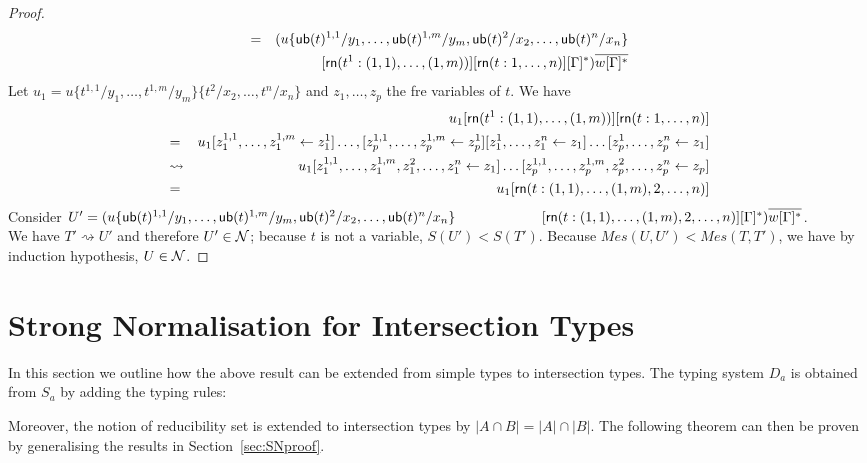 \documentclass[orivec]{llncs}
\newif\ifnonotes\nonotesfalse
\newcommand{\TODO}[1]{\ifnonotes\else{\color{red}    \noindent{\bf TODO }#1}\fi}
\begin{document}
\begin{proof}
\begin{eqnarray*}
    & = & (u\{{\mathsf{ub}}(t)^{1,1}/y_1,\dots,{\mathsf{ub}}(t)^{1,m}/y_m, {\mathsf{ub}}(t)^2/x_2,\dots,{\mathsf{ub}}(t)^n/x_n\} \\
    &   & [{\mathsf{rn}} (t^1:(1,1),\dots,(1,m))][{\mathsf{rn}} (t:1,\dots,n)][\Gamma]^*)\overline{w[\Gamma]^*}
\end{eqnarray*}
%
Let $u_1 = u\{t^{1,1}/y_1,\dots,t^{1,m}/y_m\}\{t^2/x_2,\dots,t^n/x_n\}$ and $z_1,\dots,z_p$ the fre variables of $t$. We have
%
\begin{eqnarray*}
  &                   & u_1[{\mathsf{rn}} (t^1:(1,1),\dots,(1,m))][{\mathsf{rn}} (t:1,\dots,n)] \\
  & =                 & u_1[z_1^{1,1}, \dots, z_1^{1,m} \leftarrow z_1^1]\dots, [z_p^{1,1}, \dots, z_p^{1,m} \leftarrow z_p^1][z_1^1,\dots,z_1^n\leftarrow z_1]\dots [z_p^1,\dots,z_p^n\leftarrow z_1] \\
  & \rightsquigarrow  & u_1[z_1^{1,1}, \dots, z_1^{1,m}, z_1^2,\dots,z_1^n\leftarrow z_1]\dots [z_p^{1,1}, \dots, z_p^{1,m}, z_p^2,\dots,z_p^n\leftarrow z_p] \\
  &  =                & u_1[{\mathsf{rn}} (t:(1,1),\dots,(1,m),2,\dots,n)]
\end{eqnarray*}
Consider $U' = (u\{{\mathsf{ub}}(t)^{1,1}/y_1,\dots,{\mathsf{ub}}(t)^{1,m}/y_m, {\mathsf{ub}}(t)^2/x_2,\dots,{\mathsf{ub}}(t)^n/x_n\} \\
\hspace*{62pt}[{\mathsf{rn}} (t:(1,1),\dots,(1,m),2,\dots,n)][\Gamma]^*)\overline{w[\Gamma]^*}$.
\\
We have $T'\rightsquigarrow U'$ and therefore $U'\in\mathcal{N}$; because $t$ is not a variable, $S(U')<S(T')$.
Because $Mes(U,U') < Mes(T,T')$, we have by induction hypothesis, $U\in\mathcal{N}$.


\end{proof}





\section{Strong Normalisation for Intersection Types}

In this section we outline how the above result can be extended from simple types to intersection types. The typing system $D_a$ is obtained from $S_a$ by adding the typing rules:

Moreover, the notion of reducibility set is extended to intersection types by $|A\cap B|=|A|\cap|B|$. The following theorem can then be proven by generalising the results in Section~\ref{sec:SNproof}.
\end{document}

